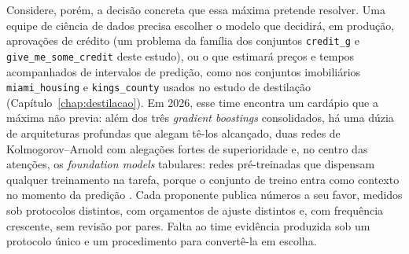 Considere, porém, a decisão concreta que essa máxima pretende resolver. Uma
equipe de ciência de dados precisa escolher o modelo que decidirá, em
produção, aprovações de crédito (um problema da família dos conjuntos
\texttt{credit\_g} e \texttt{give\_\allowbreak me\_\allowbreak some\_\allowbreak credit} deste estudo), ou o
que estimará preços e tempos acompanhados de intervalos de predição,
como nos conjuntos imobiliários \texttt{miami\_housing} e
\texttt{kings\_county} usados no estudo de destilação
(Capítulo~\ref{chap:destilacao}). Em 2026, esse time encontra um cardápio que a
máxima não previa: além dos três \emph{gradient boostings} consolidados,
há uma dúzia de arquiteturas profundas que alegam tê-los alcançado, duas
redes de Kolmogorov--Arnold com alegações fortes de superioridade e, no
centro das atenções, os \emph{foundation models} tabulares: redes
pré-treinadas que dispensam qualquer treinamento na tarefa, porque o
conjunto de
treino entra como contexto no momento da predição
\citep{hollmann2025,tabfm2026}. Cada proponente publica números a seu
favor, medidos sob protocolos distintos, com orçamentos de ajuste
distintos e, com frequência crescente, sem revisão por pares. Falta ao
time evidência produzida sob um protocolo único e um procedimento
para convertê-la em escolha.

